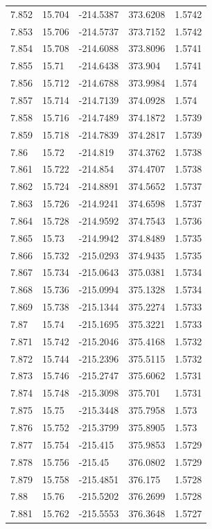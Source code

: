 \begin{tabular}{lllll}
7.852 & 15.704 & -214.5387 & 373.6208 & 1.5742 \\
7.853 & 15.706 & -214.5737 & 373.7152 & 1.5742 \\
7.854 & 15.708 & -214.6088 & 373.8096 & 1.5741 \\
7.855 & 15.71 & -214.6438 & 373.904 & 1.5741 \\
7.856 & 15.712 & -214.6788 & 373.9984 & 1.574 \\
7.857 & 15.714 & -214.7139 & 374.0928 & 1.574 \\
7.858 & 15.716 & -214.7489 & 374.1872 & 1.5739 \\
7.859 & 15.718 & -214.7839 & 374.2817 & 1.5739 \\
7.86 & 15.72 & -214.819 & 374.3762 & 1.5738 \\
7.861 & 15.722 & -214.854 & 374.4707 & 1.5738 \\
7.862 & 15.724 & -214.8891 & 374.5652 & 1.5737 \\
7.863 & 15.726 & -214.9241 & 374.6598 & 1.5737 \\
7.864 & 15.728 & -214.9592 & 374.7543 & 1.5736 \\
7.865 & 15.73 & -214.9942 & 374.8489 & 1.5735 \\
7.866 & 15.732 & -215.0293 & 374.9435 & 1.5735 \\
7.867 & 15.734 & -215.0643 & 375.0381 & 1.5734 \\
7.868 & 15.736 & -215.0994 & 375.1328 & 1.5734 \\
7.869 & 15.738 & -215.1344 & 375.2274 & 1.5733 \\
7.87 & 15.74 & -215.1695 & 375.3221 & 1.5733 \\
7.871 & 15.742 & -215.2046 & 375.4168 & 1.5732 \\
7.872 & 15.744 & -215.2396 & 375.5115 & 1.5732 \\
7.873 & 15.746 & -215.2747 & 375.6062 & 1.5731 \\
7.874 & 15.748 & -215.3098 & 375.701 & 1.5731 \\
7.875 & 15.75 & -215.3448 & 375.7958 & 1.573 \\
7.876 & 15.752 & -215.3799 & 375.8905 & 1.573 \\
7.877 & 15.754 & -215.415 & 375.9853 & 1.5729 \\
7.878 & 15.756 & -215.45 & 376.0802 & 1.5729 \\
7.879 & 15.758 & -215.4851 & 376.175 & 1.5728 \\
7.88 & 15.76 & -215.5202 & 376.2699 & 1.5728 \\
7.881 & 15.762 & -215.5553 & 376.3648 & 1.5727 \\

\end{tabular}

